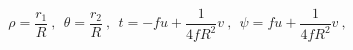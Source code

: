 \begin{equation}
 \rho = \frac{r_1}{R} ~,~~\theta = \frac{r_2}{R} ~,~~
 t = - f u  + \frac{1}{4 f R^2} v ~,~~ \psi = f u + \frac{1}{4 f R^2} v ~,
\label{Penrose}
\end{equation}

